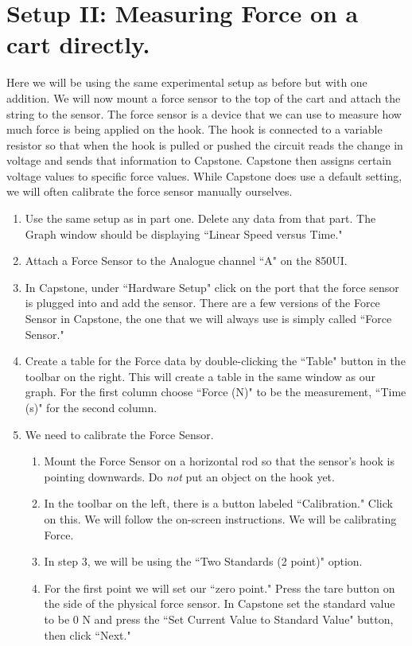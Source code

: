 \documentclass[main.tex]{subfiles}
\begin{document}
\section{Setup II: Measuring Force on a cart directly.}
Here we will be using the same experimental setup as before but with one addition. We will now mount a force sensor to the top of the cart and attach the string to the sensor. The force sensor is a device that we can use to measure how much force is being applied on the hook. The hook is connected to a variable resistor so that when the hook is pulled or pushed the circuit reads the change in voltage and sends that information to Capstone. Capstone then assigns certain voltage values to specific force values. While Capstone does use a default setting, we will often calibrate the force sensor manually ourselves.
\begin{enumerate}
\item
Use the same setup as in part one. Delete any data from that part. The Graph window should be displaying ``Linear Speed versus Time." 
\item
Attach a Force Sensor to the Analogue channel ``A" on the 850UI.
\item
In Capstone, under ``Hardware Setup" click on the port that the force sensor is plugged into and add the sensor. There are a few versions of the Force Sensor in Capstone, the one that we will always use is simply called ``Force Sensor."
\item
Create a table for the Force data by double-clicking the ``Table" button in the toolbar on the right. This will create a table in the same window as our graph. For the first column choose ``Force (N)" to be the measurement, ``Time (s)" for the second column.
\item
We need to calibrate the Force Sensor.
\begin{enumerate} \label{page:Calibration}
\item
Mount the Force Sensor on a horizontal rod so that the sensor's hook is pointing downwards. Do \emph{not} put an object on the hook yet.
\item
In the toolbar on the left, there is a button labeled ``Calibration." Click on this. We will follow the on-screen instructions. We will be calibrating Force.
\item
In step 3, we will be using the ``Two Standards (2 point)" option.
\item
For the first point we will set our ``zero point." Press the tare button on the side of the physical force sensor. In Capstone set the standard value to be 0 N and press the ``Set Current Value to Standard Value" button, then click ``Next."

\end{enumerate}
\end{enumerate}
\end{document}
